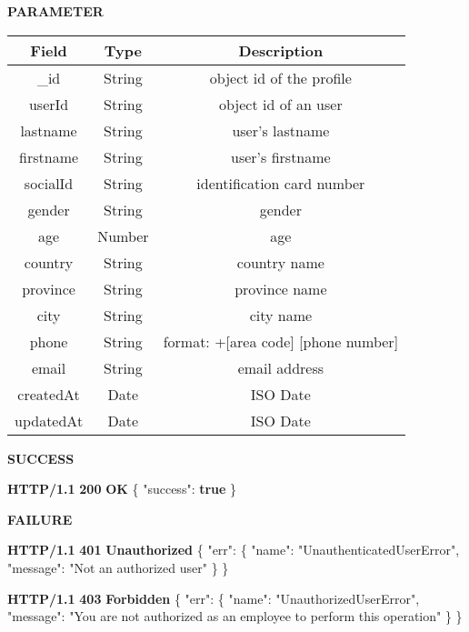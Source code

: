\documentclass[
]{article}
\newenvironment{Shaded}{}{}
\newcommand{\DataTypeTok}[1]{\textcolor[rgb]{0.56,0.13,0.00}{#1}}
\newcommand{\ErrorTok}[1]{\textcolor[rgb]{1.00,0.00,0.00}{\textbf{#1}}}
\newcommand{\FunctionTok}[1]{\textcolor[rgb]{0.02,0.16,0.49}{#1}}
\newcommand{\KeywordTok}[1]{\textcolor[rgb]{0.00,0.44,0.13}{\textbf{#1}}}
\newcommand{\StringTok}[1]{\textcolor[rgb]{0.25,0.44,0.63}{#1}}
\begin{document}
\textbf{PARAMETER}

\begin{longtable}[]{@{}ccc@{}}
\toprule
Field & Type & Description\tabularnewline
\midrule
\endhead
\_id & String & object id of the profile\tabularnewline
userId & String & object id of an user\tabularnewline
lastname & String & user's lastname\tabularnewline
firstname & String & user's firstname\tabularnewline
socialId & String & identification card number\tabularnewline
gender & String & gender\tabularnewline
age & Number & age\tabularnewline
country & String & country name\tabularnewline
province & String & province name\tabularnewline
city & String & city name\tabularnewline
phone & String & format: +{[}area code{]} {[}phone
number{]}\tabularnewline
email & String & email address\tabularnewline
createdAt & Date & ISO Date\tabularnewline
updatedAt & Date & ISO Date\tabularnewline
\bottomrule
\end{longtable}

\textbf{SUCCESS}

\begin{Shaded}
\begin{Highlighting}[]
\ErrorTok{HTTP/1.1} \ErrorTok{200} \ErrorTok{OK}
\FunctionTok{\{}
    \DataTypeTok{"success"}\FunctionTok{:} \KeywordTok{true}
\FunctionTok{\}}
\end{Highlighting}
\end{Shaded}

\textbf{FAILURE}

\begin{Shaded}
\begin{Highlighting}[]
\ErrorTok{HTTP/1.1} \ErrorTok{401} \ErrorTok{Unauthorized}
\FunctionTok{\{}
    \DataTypeTok{"err"}\FunctionTok{:} \FunctionTok{\{}
        \DataTypeTok{"name"}\FunctionTok{:} \StringTok{"UnauthenticatedUserError"}\FunctionTok{,}
        \DataTypeTok{"message"}\FunctionTok{:} \StringTok{"Not an authorized user"}
    \FunctionTok{\}}
\FunctionTok{\}}
\end{Highlighting}
\end{Shaded}

\begin{Shaded}
\begin{Highlighting}[]
\ErrorTok{HTTP/1.1} \ErrorTok{403} \ErrorTok{Forbidden}
\FunctionTok{\{}
    \DataTypeTok{"err"}\FunctionTok{:} \FunctionTok{\{}
        \DataTypeTok{"name"}\FunctionTok{:} \StringTok{"UnauthorizedUserError"}\FunctionTok{,}
        \DataTypeTok{"message"}\FunctionTok{:} \StringTok{"You are not authorized as an employee to perform this operation"}
    \FunctionTok{\}}
\FunctionTok{\}}
\end{Highlighting}
\end{Shaded}
\end{document}
